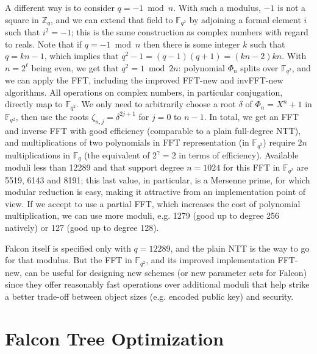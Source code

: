 \documentclass{llncs}
\newcommand{\bF}{\mathbb{F}}
\newcommand{\bZ}{\mathbb{Z}}
\begin{document}
A different way is to consider $q = -1 \bmod n$. With such a modulus,
$-1$ is not a square in $\bZ_q$, and we can extend that field to
$\bF_{q^2}$ by adjoining a formal element $i$ such that $i^2 = -1$; this
is the same construction as complex numbers with regard to reals. Note
that if $q = -1 \bmod n$ then there is some integer $k$ such that $q =
kn - 1$, which implies that $q^2 - 1 = (q - 1)(q + 1) = (kn - 2)kn$.
With $n = 2^\ell$ being even, we get that $q^2 = 1 \bmod 2n$: polynomial
$\Phi_n$ splits over $\bF_{q^2}$, and we can apply the FFT, including
the improved \textsf{FFT-new} and \textsf{invFFT-new} algorithms. All
operations on complex numbers, in particular conjugation, directly map
to $\bF_{q^2}$. We only need to arbitrarily choose a root $\delta$ of
$\Phi_n = X^n + 1$ in $\bF_{q^2}$, then use the roots $\zeta_{n,j} =
\delta^{2j+1}$ for $j = 0$ to $n - 1$. In total, we get an FFT and
inverse FFT with good efficiency (comparable to a plain full-degree
NTT), and multiplications of two polynomials in FFT representation (in
$\bF_{q^2}$) require $2n$ multiplications in $\bF_q$ (the equivalent of
$2^\gamma = 2$ in terms of efficiency). Available moduli less than 12289
and that support degree $n = 1024$ for this FFT in $\bF_{q^2}$ are 5519,
6143 and 8191; this last value, in particular, is a Mersenne prime, for
which modular reduction is easy, making it attractive from an
implementation point of view. If we accept to use a partial FFT, which
increases the cost of polynomial multiplication, we can use more moduli,
e.g. 1279 (good up to degree 256 natively) or 127 (good up to degree
128).

Falcon itself is specified only with $q = 12289$, and the plain NTT is
the way to go for that modulus. But the FFT in $\bF_{q^2}$, and its
improved implementation \textsf{FFT-new}, can be useful for designing
new schemes (or new parameter sets for Falcon) since they offer
reasonably fast operations over additional moduli that help strike a
better trade-off between object sizes (e.g. encoded public key) and
security.


\newpage
\section{Falcon Tree Optimization}\label{sec:tree}
\end{document}
